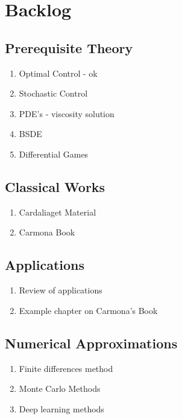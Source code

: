 \section{Backlog}
\subsection{Prerequisite Theory}
\begin{enumerate}
    \item Optimal Control - ok
    \item Stochastic Control
    \item PDE's - viscosity solution
    \item BSDE
    \item Differential Games
\end{enumerate}

\subsection{Classical Works}
\begin{enumerate}
    \item Cardaliaget Material
    \item Carmona Book
\end{enumerate}

\subsection{Applications}
\begin{enumerate}
    \item Review of applications
    \item Example chapter on Carmona's Book
\end{enumerate}

\subsection{Numerical Approximations}
\begin{enumerate}
    \item Finite differences method
    \item Monte Carlo Methods
    \item Deep learning methods
\end{enumerate}